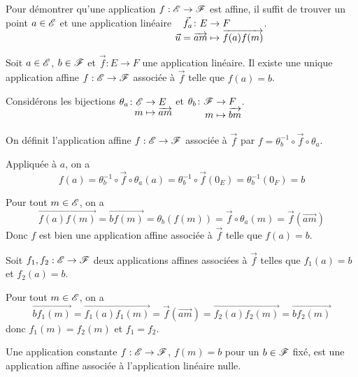 \documentclass[a4paper, 12pt]{article}
\begin{document}
\begin{remarque}
    Pour démontrer qu'une application $f: \mathscr{E} \to \mathscr{F}$ est affine, il suffit de trouver un point $a \in \mathscr{E}$
    et une application linéaire $\funcdef{\vec{f_a}}{E}{F}{\vec{u} = \overrightarrow{am}}{\overrightarrow{f(a)f(m)}}$.
\end{remarque}

\begin{proposition}{}{}
    Soit $a \in \mathscr{E}$, $b \in \mathscr{F}$ et $\vec{f}: E \to F$ une application linéaire.
    Il existe une unique application affine $f: \mathscr{E} \to \mathscr{F}$ associée à $\vec{f}$ telle que
    $f(a) = b$.
\end{proposition}

\begin{demonstration}
    \begin{description}[leftmargin=!,labelwidth=2.5cm]
        

    \item[\textbf{Existence:}]
        Considérons les bijections $\funcdef{\theta_a}{\E}{E}{m}{\overrightarrow{am}}$ et
        $\funcdef{\theta_b}{\F}{F}{m}{\overrightarrow{bm}}$.
        
        On définit l'application affine $f: \mathscr{E} \to \mathscr{F}$ associée à $\vec{f}$ par $f = \theta_b^{-1} \circ \vec{f} \circ \theta_a$.

        Appliquée à $a$, on a
        $$
        f(a) = \theta_b^{-1} \circ \vec{f} \circ \theta_a (a) = \theta_b^{-1} \circ \vec{f} (0_E) = \theta_b^{-1}(0_F) = b
        $$

        Pour tout $m \in \mathscr{E}$, on a
        $$
            \overrightarrow{f(a) f(m)} = \overrightarrow{b f(m)} = \theta_b(f(m)) = \vec{f} \circ \theta_a (m) = \vec{f}(\overrightarrow{am})
        $$
    Donc $f$ est bien une application affine associée à $\vec{f}$ telle que $f(a) = b$.

    \item[\textbf{Unicité:}] Soit $f_1, f_2: \mathscr{E} \to \mathscr{F}$ deux applications affines associées à $\vec{f}$
    telles que $f_1(a) = b$ et $f_2(a) = b$.

    Pour tout $m \in \mathscr{E}$, on a
    $$
    \overrightarrow{b f_1(m)} = \overrightarrow{f_1(a) f_1(m)} = \vec{f}(\overrightarrow{am}) = \overrightarrow{f_2(a) f_2(m)} = \overrightarrow{b f_2(m)}
    $$
    donc $f_1(m) = f_2(m)$ et $f_1 = f_2$.
    \end{description}
\end{demonstration}

\begin{exemple}{}{}
    Une application constante $f: \mathscr{E} \to \mathscr{F}$, $f(m) = b$ pour un $b \in \mathscr{F}$ fixé, est une application affine
    associée à l'application linéaire nulle.
\end{exemple}
\end{document}

